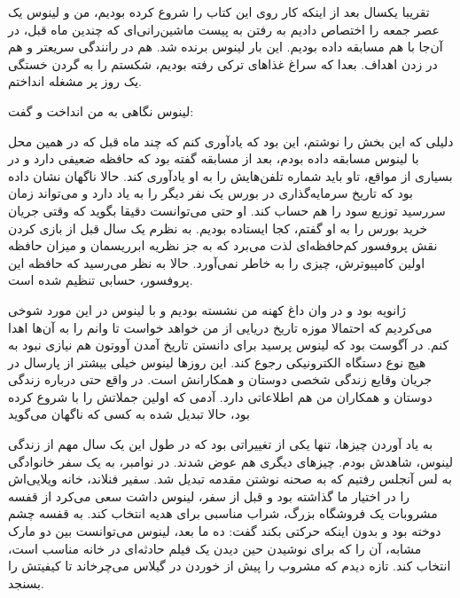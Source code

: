 \begin{journal}
تقریبا یکسال بعد از اینکه کار روی این کتاب را شروع کرده بودیم، من و
لینوس یک عصر جمعه را اختصاص دادیم به رفتن به پیست ماشین‌رانی‌ای که چندین
ماه قبل، در آن‌جا با هم مسابقه داده بودیم. این بار لینوس برنده شد. هم
در رانندگی سریعتر و هم در زدن اهداف. بعدا که سراغ غذاهای ترکی رفته
بودیم، شکستم را به گردن خستگی یک روز پر مشغله انداختم.

لینوس نگاهی به من انداخت و گفت: 



دلیلی که این بخش را نوشتم، این بود که یادآوری کنم که چند ماه قبل که در
همین محل با لینوس مسابقه داده بودم، بعد از مسابقه گفته بود که حافظه
ضعیفی دارد و در بسیاری از مواقع،‌ تاو باید شماره‌ تلفن‌هایش را به او
یادآوری کند. حالا ناگهان نشان داده بود که تاریخ سرمایه‌گذاری در بورس یک
نفر دیگر را به یاد دارد و می‌تواند زمان سررسید توزیع سود را هم حساب
کند. او حتی می‌توانست دقیقا بگوید که وقتی جریان خرید بورس را به او
گفتم،‌ کجا ایستاده بودیم. به نظرم یک سال قبل از بازی کردن نقش پروفسور
کم‌حافظه‌ای لذت می‌برد که به جز نظریه ابرریسمان و میزان حافظه اولین
کامپیوترش، چیزی را به خاطر نمی‌آورد. حالا به نظر می‌رسید که حافظه این
پروفسور، حسابی تنظیم شده است.

ژانویه بود و در وان داغ کهنه من نشسته بودیم و با لینوس در این مورد
شوخی می‌کردیم که احتمالا موزه تاریخ دریایی از من خواهد خواست تا وانم را
به آن‌ها اهدا کنم. در آگوست بود که لینوس پرسید  برای دانستن تاریخ آمدن آووتون هم نیازی
نبود به هیچ نوع دستگاه الکترونیکی رجوع کند. این روزها لینوس خیلی بیشتر
از پارسال در جریان وقایع زندگی شخصی دوستان و همکارانش است. در واقع حتی
درباره زندگی دوستان و همکاران من هم اطلاعاتی دارد. آدمی که اولین
جملاتش را با  شروع
کرده بود، حالا تبدیل شده به کسی که ناگهان می‌گوید 

به یاد آوردن چیزها، تنها یکی از تغییراتی بود که در طول این یک سال مهم
از زندگی لینوس، شاهدش بودم. چیزهای دیگری هم عوض شدند. در نوامبر، به یک
سفر خانوادگی به لس آنجلس رفتیم که به صحنه نوشتن مقدمه  تبدیل شد. سفیر فنلاند، خانه ویلایی‌اش را در اختیار ما گذاشته
بود و قبل از سفر،‌ لینوس داشت سعی می‌کرد از قفسه مشروبات یک فروشگاه
بزرگ، شراب مناسبی برای هدیه انتخاب کند. به قفسه چشم دوخته بود و بدون
اینکه حرکتی بکند گفت:  ده ما بعد، لینوس می‌توانست بین دو مارک مشابه، آن را که
برای نوشیدن حین دیدن یک فیلم حادثه‌ای در خانه مناسب است، انتخاب
کند. تازه دیدم که مشروب را پیش از خوردن در گیلاس می‌چرخاند تا کیفیتش را
بسنجد.


\end{journal}
